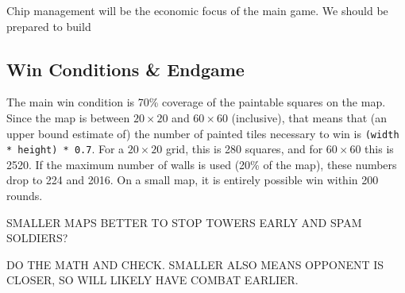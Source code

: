 \documentclass{article}
\begin{document}
  Chip management will be the economic focus of the main game. We should be prepared to build 

  \subsection*{Win Conditions \& Endgame}

  The main win condition is 70\% coverage of the paintable squares on the map. Since the map is between $20 \times 20$ and $60 \times 60$ (inclusive), that means that (an upper bound estimate of) the number of painted tiles necessary to win is \verb|(width * height) * 0.7|. For a $20 \times 20$ grid, this is 280 squares, and for $60 \times 60$ this is 2520. If the maximum number of walls is used (20\% of the map), these numbers drop to 224 and 2016. On a small map, it is entirely possible win within 200 rounds.
  \begin{center}
    SMALLER MAPS BETTER TO STOP TOWERS EARLY AND SPAM SOLDIERS?
    
    DO THE MATH AND CHECK. SMALLER ALSO MEANS OPPONENT IS CLOSER, SO WILL LIKELY HAVE COMBAT EARLIER.
  \end{center}
\end{document}
